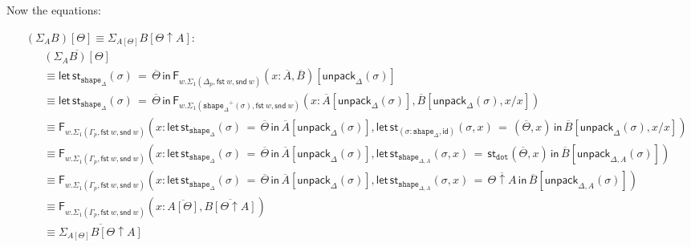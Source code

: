 \documentclass[10pt]{article}
\theoremstyle{definition}
\newcommand\dsd[1]{\ensuremath{\mathsf{#1}}}
\newcommand{\app}[2]{\ensuremath{#1 \: #2}}
\newcommand{\fst}[1]{\app{\dsd{fst}}{#1}}
\newcommand{\snd}[1]{\app{\dsd{snd}}{#1}}
\newcommand{\id}{\mathsf{id}}
\newcommand\F[2]{\ensuremath{\mathsf{F}_{#1}(#2)}}
\newcommand\StI[2]{\ensuremath{\mathsf{st}_{#1}(#2)}}
\newcommand\StE[4]{\ensuremath{\mathsf{let} \, \StI{#1}{#3} \, = \, {#2} \, \mathsf{in} \, #4}}
\newcommand\TrPlus[2]{\ensuremath{{#1}^+(#2)}}
\newcommand\unpack[2]{\ensuremath{\mathsf{unpack}_{#1}(#2)}}
\newcommand{\modeof}[1]{{#1}_p}
\newcommand{\tdot}{\ensuremath{\mathtt{dot}}}
\newcommand{\tshape}[1]{\ensuremath{\mathtt{shape}_{#1}}}
\newcommand{\upstairs}[1]{\overline{#1}}
\begin{document}
Now the equations:
\begin{enumerate}[style = multiline, labelwidth = 80pt]
\item[{$(\Sigma_A B)[\Theta] \equiv \Sigma_{A[\Theta]} B[\Theta \uparrow A]$}:] 
\begin{align*}
&\upstairs{(\Sigma_A B)[\Theta]} \\
&\equiv \StE{\tshape{\Delta}}{\upstairs{\Theta}}{\sigma}{\F{w. \Sigma_1(\modeof{\Delta},\fst w, \snd w)}{x : \upstairs{A}, \upstairs{B}}[\unpack{\Delta}{\sigma}]} \\
&\equiv \StE{\tshape{\Delta}}{\upstairs{\Theta}}{\sigma}{\F{w. \Sigma_1(\TrPlus{\tshape{\Delta}}{\sigma},\fst w, \snd w)}{x : \upstairs{A}[\unpack{\Delta}{\sigma}], \upstairs{B}[\unpack{\Delta}{\sigma}, x / x] }} \\
&\equiv \F{w. \Sigma_1(\modeof{\Gamma},\fst w, \snd w)}{x : \StE{\tshape{\Delta}}{\upstairs{\Theta}}{\sigma}{\upstairs{A}[\unpack{\Delta}{\sigma}]}, \StE{(\sigma : \tshape{\Delta}, \id)}{(\upstairs{\Theta},x)}{\sigma, x}{\upstairs{B}[\unpack{\Delta}{\sigma}, x/x]} } \\
&\equiv \F{w. \Sigma_1(\modeof{\Gamma},\fst w, \snd w)}{x : \StE{\tshape{\Delta}}{\upstairs{\Theta}}{\sigma}{\upstairs{A}[\unpack{\Delta}{\sigma}]}, \StE{\tshape{\Delta, A}}{\StI{\tdot}{\upstairs{\Theta},x}}{\sigma, x}{\upstairs{B}[\unpack{\Delta, A}{\sigma}]} } \\
&\equiv \F{w. \Sigma_1(\modeof{\Gamma},\fst w, \snd w)}{x : \StE{\tshape{\Delta}}{\upstairs{\Theta}}{\sigma}{\upstairs{A}[\unpack{\Delta}{\sigma}]}, \StE{\tshape{\Delta, A}}{\upstairs{\Theta \uparrow A}}{\sigma, x}{\upstairs{B}[\unpack{\Delta, A}{\sigma}]} } \\
&\equiv \F{w. \Sigma_1(\modeof{\Gamma},\fst w, \snd w)}{x : \upstairs{A[\Theta]}, \upstairs{B[\Theta \uparrow A]}} \\
&\equiv \upstairs{\Sigma_{A[\Theta]} B[\Theta \uparrow A]}
\end{align*}


\end{enumerate}
\end{document}
